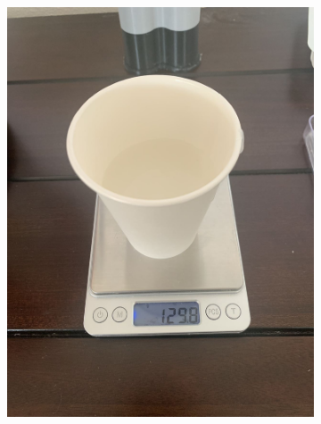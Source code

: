 \documentclass[twoside, 11pt]{article}
\begin{document}
\begin{figure}[H]
\begin{subfigure}[t]{0.165\linewidth}
		\includegraphics[width=\textwidth]{part b}
	\end{subfigure}%
	\begin{subfigure}[t]{0.165\linewidth}
		\centering

\end{subfigure}
\end{figure}
\end{document}
